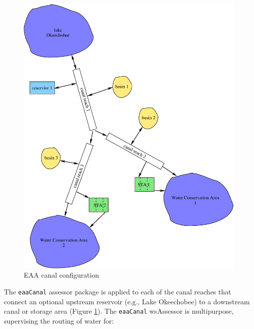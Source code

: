 \begin{figure}[!htb]
 \begin{center}
  \includegraphics[scale=.5]{Graphics/eaacanal}
  \caption{\label{fig:eaacanal} EAA canal configuration}
 \end{center}
\end{figure}

The {\tt eaaCanal} assessor package is applied to each of the canal
reaches that connect an optional upstream reservoir (e.g., Lake
Okeechobee) to a downstream canal or storage area
(Figure \ref{fig:eaacanal}).  The {\tt eaaCanal} wsAssessor is
multipurpose, supervising the routing of water for:

